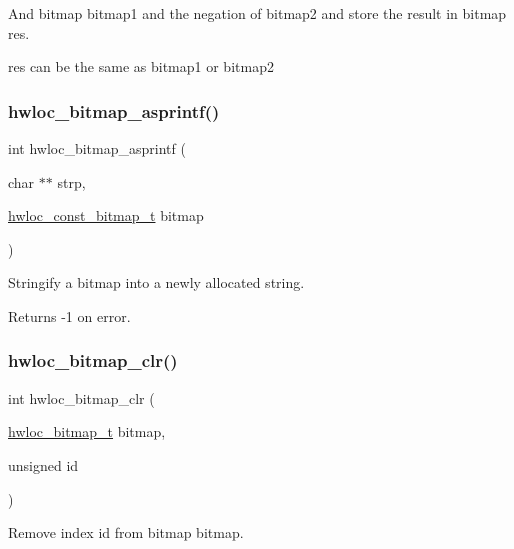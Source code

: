 And bitmap {\ttfamily bitmap1} and the negation of {\ttfamily bitmap2} and store the result in bitmap {\ttfamily res}. 

{\ttfamily res} can be the same as {\ttfamily bitmap1} or {\ttfamily bitmap2} \mbox{\label{a00205_ga0fece972134fdecf2da9bc7a11dd827e}} 
\subsubsection{\texorpdfstring{hwloc\+\_\+bitmap\+\_\+asprintf()}{hwloc\_bitmap\_asprintf()}}
{\footnotesize\ttfamily int hwloc\+\_\+bitmap\+\_\+asprintf (\begin{DoxyParamCaption}\item[{char $\ast$$\ast$}]{strp,  }\item[{\hyperlink{a00205_gae991a108af01d408be2776c5b2c467b2}{hwloc\+\_\+const\+\_\+bitmap\+\_\+t}}]{bitmap }\end{DoxyParamCaption})}



Stringify a bitmap into a newly allocated string. 

\begin{DoxyReturn}{Returns}
-\/1 on error. 
\end{DoxyReturn}
\mbox{\label{a00205_gaf20bb350b6844d08931a064a73f86743}} 
\subsubsection{\texorpdfstring{hwloc\+\_\+bitmap\+\_\+clr()}{hwloc\_bitmap\_clr()}}
{\footnotesize\ttfamily int hwloc\+\_\+bitmap\+\_\+clr (\begin{DoxyParamCaption}\item[{\hyperlink{a00205_gaa3c2bf4c776d603dcebbb61b0c923d84}{hwloc\+\_\+bitmap\+\_\+t}}]{bitmap,  }\item[{unsigned}]{id }\end{DoxyParamCaption})}



Remove index {\ttfamily id} from bitmap {\ttfamily bitmap}. 

